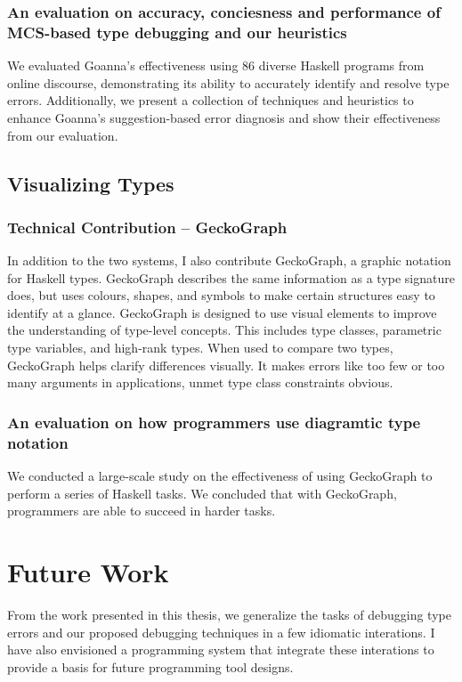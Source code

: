 \subsubsection{An evaluation on accuracy, conciesness and performance of MCS-based type debugging and our heuristics}

We evaluated Goanna's effectiveness using 86 diverse Haskell programs from online discourse, demonstrating its ability to accurately identify and resolve type errors. Additionally, we present a collection of techniques and heuristics to enhance Goanna's suggestion-based error diagnosis and show their effectiveness from our evaluation.


\subsection{Visualizing Types}

\subsubsection{Technical Contribution -- GeckoGraph}

In addition to the two systems, I also contribute GeckoGraph, a graphic notation for Haskell types. GeckoGraph describes the same information as a type signature does, but uses colours, shapes, and symbols to make certain structures easy to identify at a glance. GeckoGraph is designed to use visual elements to improve the understanding of type-level concepts. This includes type classes, parametric type variables, and high-rank types. When used to compare two types, GeckoGraph helps clarify differences visually. It makes errors like too few or too many arguments in applications, unmet type class constraints obvious.

\subsubsection{An evaluation on how programmers use diagramtic type notation}

We conducted a large-scale study on the effectiveness of using GeckoGraph to perform a series of Haskell tasks. We concluded that with GeckoGraph, programmers are able to succeed in harder tasks.

\section{Future Work}

From the work presented in this thesis, we generalize the tasks of debugging type errors and our proposed debugging techniques in a few idiomatic interations.  I have also envisioned a programming system that integrate these interations to provide a basis for future programming tool designs.

